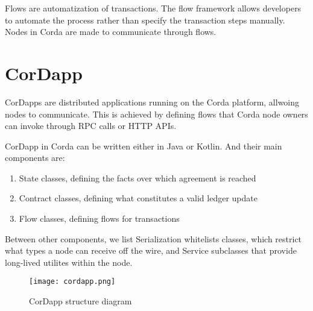 Flows are automatization of transactions. The flow framework allows developers to automate the process rather than specify the transaction steps manually. Nodes in Corda are made to communicate through flows.
\newpage

\section{CorDapp}

CorDapps are distributed applications running on the Corda platform, allwoing nodes to communicate. This is achieved by defining flows that Corda node owners can invoke through RPC calls or HTTP APIs.

CorDapp in Corda can be written either in Java or Kotlin. And their main components are:

\begin{enumerate}
    \item State classes, defining the facts over which agreement is reached
    \item Contract classes, defining what constitutes a valid ledger update 
    \item Flow classes, defining flows for transactions
\end{enumerate}

Between other components, we list Serialization whitelists classes, which restrict what types a node can receive off the wire, and Service subclasses that provide long-lived utilites within the node.

\begin{figure}[b]
    \centering
    \texttt{[image: cordapp.png]}
    \caption{CorDapp structure diagram}
\end{figure}

